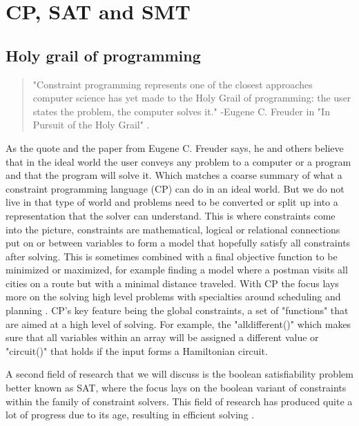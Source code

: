 \chapter{CP, SAT and SMT}
\label{cha:2:CS}
\label{CS:Intro}
\label{CS:HolyGrail}
\section{Holy grail of programming}
\begin{quote}
	"Constraint programming represents one of the closest approaches computer science has yet made to the Holy Grail of programming: the user states the problem, the computer solves it." 
	\newline
	-Eugene C. Freuder in "In Pursuit of the Holy Grail" \cite{11freuder1997pursuitHolyGrail}.
\end{quote}
As the quote and the paper \cite{11freuder1997pursuitHolyGrail} from Eugene C. Freuder says, he and others believe that in the ideal world the user conveys any problem to a computer or a program and that the program will solve it. Which matches a coarse summary of what a constraint programming language (CP) can do in an ideal world. But we do not live in that type of world and problems need to be converted or split up into a representation that the solver can understand. 
This is where constraints come into the picture, constraints are mathematical, logical or relational connections put on or between variables to form a model that hopefully satisfy all constraints after solving. This is sometimes combined with a final objective function to be minimized or maximized, for example finding a model where a postman visits all cities on a route but with a minimal distance traveled. 
With CP the focus lays more on the solving high level problems with specialties around scheduling and planning \cite{52bartak1999constraint}. CP's key feature being the global constraints, a set of "functions" that are aimed at a high level of solving. For example, the "alldifferent()" which makes sure that all variables within an array will be assigned a different value or "circuit()" that holds if the input forms a Hamiltonian circuit.

A second field of research that we will discuss is the boolean satisfiability problem better known as SAT, where the focus lays on the boolean variant of constraints within the family of constraint solvers. This field of research has produced quite a lot of progress due to its age, resulting in efficient solving \cite{56bardin2019bringing}.

